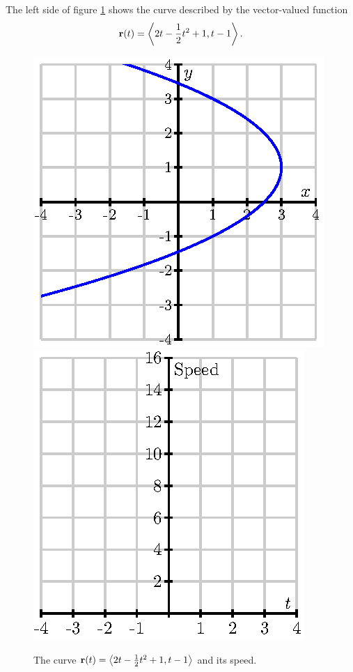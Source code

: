 \begin{activity} \label{A:9.7.8} The left side of figure
  \ref{F:9.7.space.curve} shows the curve described by the
  vector-valued function
  $$\mathbf{r}(t) = \left\langle 2t-\frac12 t^2 + 1,
        t-1\right\rangle.$$

\begin{figure}[ht]
  \begin{center}
    \includegraphics{figures/fig_9_7_space_curve.eps}
    \hspace*{20pt}
    \includegraphics{figures/fig_9_7_speed_graph.eps}
    \caption{The curve $\mathbf{r}(t) = \left\langle 2t-\frac12 t^2 + 1,
        t-1\right\rangle$ and its speed.}
    \label{F:9.7.space.curve}
  \end{center}
\end{figure}


\end{activity}
